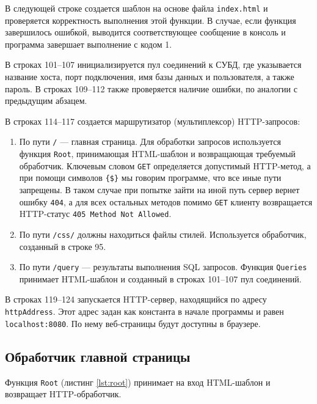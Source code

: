 В следующей строке создается шаблон на основе файла \texttt{index.html} и проверяется корректность выполнения этой
функции.
В случае, если функция завершилось ошибкой, выводится соответствующее сообщение в консоль и программа завершает
выполнение
с кодом 1.

В строках 101--107 инициализируется пул соединений к СУБД, где указывается название хоста, порт подключения,
имя базы данных и пользователя, а также пароль.
В строках 109--112 также проверяется наличие ошибки, по аналогии с предыдущим абзацем.

В строках 114--117 создается маршрутизатор (мультиплексор) HTTP-запросов:
\begin{enumerate}
    \item По пути \texttt{/} --- главная страница.
    Для обработки запросов используется функция \texttt{Root}, принимающая HTML-шаблон и возвращающая требуемый
    обработчик.
    Ключевым словом \texttt{GET} определяется допустимый HTTP-метод, а при помощи символов \texttt{\{\$\}} мы говорим
    программе, что все иные пути запрещены.
    В таком случае при попытке зайти на иной путь сервер вернет ошибку \texttt{404},
    а для всех остальных методов помимо \texttt{GET} клиенту возвращается HTTP-статус \texttt{405 Method Not Allowed}.
    \item По пути \texttt{/css/} должны находиться файлы стилей.
    Используется обработчик, созданный в строке 95.
    \item По пути \texttt{/query} --- результаты выполнения SQL запросов.
    Функция \texttt{Queries} принимает HTML-шаблон и созданный в строках 101--107 пул соединений.
\end{enumerate}

В строках 119--124 запускается HTTP-сервер, находящийся по адресу \texttt{httpAddress}.
Этот адрес задан как константа в начале программы и равен \texttt{localhost:8080}.
По нему веб-страницы будут доступны в браузере.

\subsection{Обработчик главной страницы}

Функция \texttt{Root} (листинг \ref{lst:root}) принимает на вход HTML-шаблон и возвращает HTTP-обработчик.

\begin{listing}[H]
    \caption{Обработчик главной страницы}
    \label{lst:root}
\end{listing}


